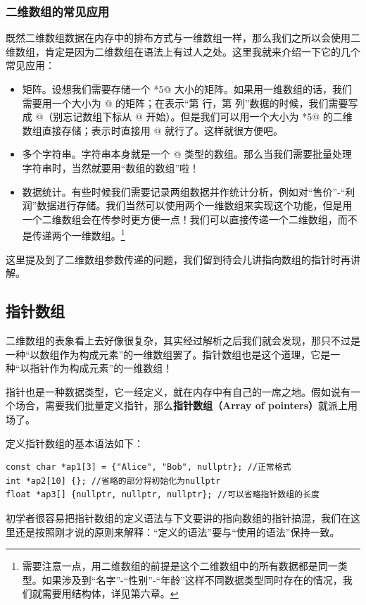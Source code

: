\subsubsection*{二维数组的常见应用}
既然二维数组数据在内存中的排布方式与一维数组一样，那么我们之所以会使用二维数组，肯定是因为二维数组在语法上有过人之处。这里我就来介绍一下它的几个常见应用：
\begin{itemize}
    \item 矩阵。设想我们需要存储一个 *5@ 大小的矩阵。如果用一维数组的话，我们需要用一个大小为 @ 的矩阵；在表示``第 \lstinline@n@ 行，第 \lstinline@m@ 列''数据的时候，我们需要写成 \lstinline@arr[(n-1)*5+(m-n)]@（别忘记数组下标从 @ 开始）。但是我们可以用一个大小为 *5@ 的二维数组直接存储；表示时直接用 \lstinline@darr[n-1][m-1]@ 就行了。这样就很方便吧。
    \item 多个字符串。字符串本身就是一个 \lstinline@char[N]@ 类型的数组。那么当我们需要批量处理字符串时，当然就要用``数组的数组''啦！
    \item 数据统计。有些时候我们需要记录两组数据并作统计分析，例如对``售价''-``利润''数据进行存储。我们当然可以使用两个一维数组来实现这个功能，但是用一个二维数组会在传参时更方便一点！我们可以直接传递一个二维数组，而不是传递两个一维数组。\footnote{需要注意一点，用二维数组的前提是这个二维数组中的所有数据都是同一类型。如果涉及到``名字''-``性别''-``年龄''这样不同数据类型同时存在的情况，我们就需要用结构体，详见第六章。}
\end{itemize}
这里提及到了二维数组参数传递的问题，我们留到待会儿讲指向数组的指针时再讲解。\par
\subsection*{指针数组}
二维数组的表象看上去好像很复杂，其实经过解析之后我们就会发现，那只不过是一种``以数组作为构成元素''的一维数组罢了。指针数组也是这个道理，它是一种``以指针作为构成元素''的一维数组！\par
指针也是一种数据类型，它一经定义，就在内存中有自己的一席之地。假如说有一个场合，需要我们批量定义指针，那么\textbf{指针数组（Array of pointers）}就派上用场了。\par
定义指针数组的基本语法如下：
\begin{lstlisting}
const char *ap1[3] = {"Alice", "Bob", nullptr}; //正常格式
int *ap2[10] {}; //省略的部分将初始化为nullptr
float *ap3[] {nullptr, nullptr, nullptr}; //可以省略指针数组的长度
\end{lstlisting}
初学者很容易把指针数组的定义语法与下文要讲的指向数组的指针搞混，我们在这里还是按照刚才说的原则来解释：``定义的语法''要与``使用的语法''保持一致。\par
